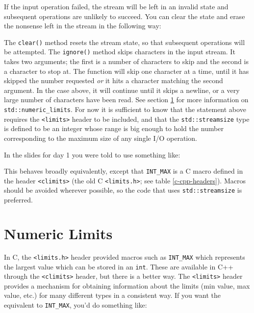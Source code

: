 \documentclass[a4paper]{scrartcl}
\begin{document}
If the input operation failed, the stream will be left in an invalid state and subsequent operations are unlikely to succeed. You can clear the state and erase the nonsense left in the stream in the following way:



The \texttt{clear()} method resets the stream state, so that subsequent operations will be attempted. The \texttt{ignore()} method skips characters in the input stream. It takes two arguments; the first is a number of characters to skip and the second is a character to stop at. The function will skip one character at a time, until it has skipped the number requested \emph{or} it hits a character matching the second argument. In the case above, it will continue until it skips a newline, or a very large number of characters have been read. See section \ref{numeric-limits} for more information on \texttt{std::numeric\_limits}. For now it is sufficient to know that the statement above requires the \texttt{<limits>} header to be included, and that the \texttt{std::streamsize} type is defined to be an integer whose range is big enough to hold the number corresponding to the maximum size of any single I/O operation.

In the slides for day 1 you were told to use something like:



This behaves broadly equivalently, except that \texttt{INT\_MAX} is a C macro defined in the header \texttt{<climits>} (the old C \texttt{<limits.h>}; see table \ref{c-cpp-headers}). Macros should be avoided wherever possible, so the code that uses \texttt{std::streamsize} is preferred.

\section{Numeric Limits}\label{numeric-limits}
In C, the \texttt{<limits.h>} header provided macros such as \texttt{INT\_MAX} which represents the largest value which can be stored in an \texttt{int}. These are available in C++ through the \texttt{<climits>} header, but there is a better way. The \texttt{<limits>} header provides a mechanism for obtaining information about the limits (min value, max value, etc.) for many different types in a consistent way. If you want the equivalent to \texttt{INT\_MAX}, you'd do something like:


\end{document}
